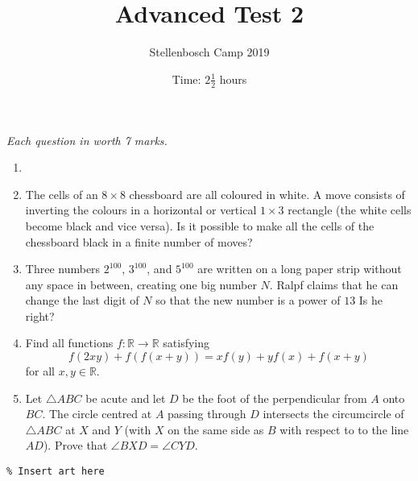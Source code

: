 \documentclass{article}
\title{Advanced Test 2}
\author{Stellenbosch Camp 2019}
\date{Time: $2\frac{1}{2}$ hours}
\begin{document}
\maketitle
\thispagestyle{empty}

\hfill\textit{Each question in worth 7 marks.}

\vspace{24pt}


\begin{enumerate}[1.]

\item %


\item %
The cells of an $8 \times 8$ chessboard are all coloured in white.
A move consists of inverting the colours in a horizontal or vertical $1 \times 3$ rectangle (the white cells become black and vice versa).
Is it possible to make all the cells of the chessboard black in a finite number of moves?


\item %
Three numbers $2^{100}$, $3^{100}$, and $5^{100}$ are written on a long paper strip without any space in between, creating one big number $N$.
Ralpf claims that he can change the last digit of $N$ so that the new number is a power of $13$
Is he right?


\item
Find all functions $f: \mathbb{R} \to \mathbb{R}$ satisfying
\[ f(2xy) +f(f(x+y)) = xf(y) + yf(x) +f(x+y) \]
for all $x,y \in \mathbb{R}$.


\item %
Let $\triangle ABC$ be acute and let $D$ be the foot of the perpendicular from $A$ onto $BC$.
The circle centred at $A$ passing through $D$ intersects the circumcircle of $\triangle ABC$ at $X$ and $Y$ (with $X$ on the same side as $B$ with respect to to the line $AD$).
Prove that $\angle BXD = \angle CYD$.

\end{enumerate}


\vfill
\begin{center}
\begin{BVerbatim}
\end{BVerbatim}
\end{center}
\end{document}
